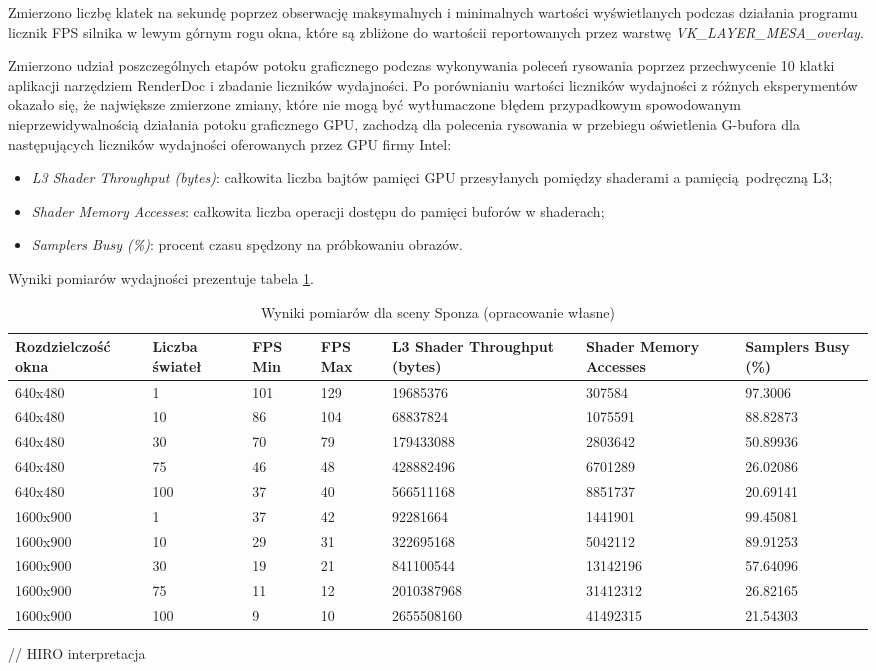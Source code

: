 Zmierzono liczbę klatek na sekundę poprzez obserwację maksymalnych i minimalnych wartości wyświetlanych podczas działania programu licznik FPS silnika w lewym górnym rogu okna, które są zbliżone do wartościi reportowanych przez warstwę \textit{VK\_LAYER\_MESA\_overlay}.

Zmierzono udział poszczególnych etapów potoku graficznego podczas wykonywania poleceń rysowania poprzez przechwycenie 10 klatki aplikacji narzędziem RenderDoc i zbadanie liczników wydajności.
Po porównianiu wartości liczników wydajności z różnych eksperymentów okazało się, że największe zmierzone zmiany, które nie mogą być wytłumaczone błędem przypadkowym spowodowanym nieprzewidywalnością działania potoku graficznego GPU, zachodzą dla polecenia rysowania w przebiegu oświetlenia G-bufora dla następujących liczników wydajności oferowanych przez GPU firmy Intel:
\begin{itemize}
	\item \textit{L3 Shader Throughput (bytes)}: całkowita liczba bajtów pamięci GPU przesyłanych pomiędzy shaderami a pamięcią podręczną L3;
	\item \textit{Shader Memory Accesses}: całkowita liczba operacji dostępu do pamięci buforów w shaderach;
	\item \textit{Samplers Busy (\%)}: procent czasu spędzony na próbkowaniu obrazów.
\end{itemize}

Wyniki pomiarów wydajności prezentuje tabela \ref{results_sponza}.

\begin{table}[!ht]
	\centering
	\begin{tabular}{ |p{2cm}|p{1.1cm}||p{0.7cm}|p{0.7cm}|p{1.8cm}|p{1.7cm}|p{1.6cm}|}
		\hline
		Rozdzielczość okna & Liczba świateł & FPS Min & FPS Max & L3 Shader Throughput (bytes) & Shader Memory Accesses & Samplers Busy (\%) \\
		\hline \hline
		640x480 & 1 & 101 & 129 & 19685376 & 307584 & 97.3006 \\
		\hline 
		640x480 & 10 & 86 & 104 & 68837824 & 1075591 & 88.82873 \\
		\hline 
		640x480 & 30 & 70 & 79  & 179433088 & 2803642 & 50.89936 \\
		\hline 
		640x480 & 75 & 46 & 48 & 428882496 & 6701289 & 26.02086 \\
		\hline 
		640x480 & 100 & 37  & 40 & 566511168 & 8851737 & 20.69141 \\
		\hline 	\hline 
		1600x900 & 1 & 37  & 42 & 92281664 & 1441901 & 99.45081 \\
		\hline 
		1600x900 & 10 & 29  & 31 & 322695168 & 5042112 & 89.91253 \\
		\hline 
		1600x900 & 30 & 19 & 21 & 841100544 & 13142196 & 57.64096 \\
		\hline 
		1600x900 & 75 & 11 & 12 & 2010387968 & 31412312 & 26.82165 \\
		\hline 
		1600x900 & 100 & 9  & 10 & 2655508160 & 41492315 & 21.54303 \\
		\hline
	\end{tabular}
	\caption{Wyniki pomiarów dla sceny Sponza (opracowanie własne)} 
	\label{results_sponza}
\end{table}


// HIRO interpretacja

